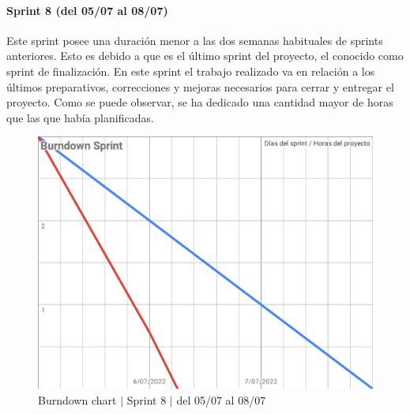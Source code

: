 \paragraph{Sprint 8 (del 05/07 al 08/07)}
Este sprint posee una duración menor a las dos semanas habituales de sprints anteriores. Esto es debido a que es el último sprint del proyecto, el conocido como sprint de finalización. En este sprint el trabajo realizado va en relación a los últimos preparativos, correcciones y mejoras necesarios para cerrar y entregar el proyecto. Como se puede observar, se ha dedicado una cantidad mayor de horas que las que había planificadas.
\begin{figure}[H]
    \centering
    \includegraphics[width=1\linewidth]{text/image/BurndownChart8.pdf}
    \caption{Burndown chart $|$ Sprint 8 $|$ del 05/07 al 08/07}
    \label{fig:burndown_chart_8}
\end{figure}